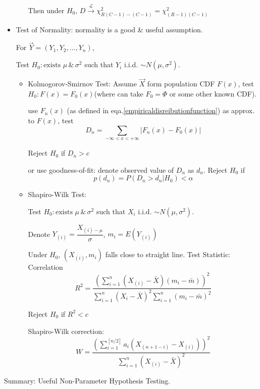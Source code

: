 \begin{itemize}
\begin{itemize}
    Then under $H_0$, $D\xrightarrow[]{\mathscr{L}}\chi^2_{R(C-1)-(C-1)}=\chi^2_{(R-1)(C-1)}$
    \end{itemize}

    \item Test of Normality: normality is a good \& useful assumption.
    
    For $\vec{Y}=(Y_1,Y_2,\ldots,Y_n)$,

    Test $H_0:\text{exists }\mu\,\&\, \sigma^2$ such that $Y_i$ i.i.d. $\sim N(\mu,\sigma^2)$.

    \begin{itemize}
        \item Kolmogorov-Smirnov Test: Assume $\vec{X}$ form population CDF $F(x)$, test $H_0:F(x)=F_0(x)$(where can take $F_0=\Phi$ or some other known CDF).
        
        use $F_n(x)$ (as defined in eqa.\ref{empiricaldisreibutionfunction}) as approx. to $F(x)$, test
        \[
            D_n=\sum_{-\infty< x<+\infty}|F_n(x)-F_0(x)|
        \]

        Reject $H_0$ if $D_n>c$

        or use goodness-of-fit: denote observed value of $D_n$ as $d_n$. Reject $H_0$ if
        \[
            p(d_n)=P(D_n>d_n|H_0)<\alpha
        \]

        \item Shapiro-Wilk Test:
        
        Test $H_0:\text{exists }\mu\,\&\, \sigma^2$ such that $X_i$ i.i.d. $\sim N(\mu,\sigma^2)$.

        Denote $Y_{(i)}=\dfrac{X_{(i)-\mu}}{\sigma}$, $m_i=E(Y_{(i)})$

        Under $H_0$, $(X_{(i)},m_i)$ falls close to straight line. Test Statistic: Correlation
        \[
            R^2=\dfrac{\left(\sum_{i=1}^n(X_{(i)}-\bar{X})(m_i-\bar{m})\right)^2}{\sum_{i=1}^n(X_{i}-\bar{X})^2\sum_{i=1}^n(m_i-\bar{m})^2}
        \]

        Reject $H_0$ if $R^2<c$

        Shapiro-Wilk correction:
        \[
            W=\dfrac{\left(\sum_{i=1}^{[n/2]}a_i(X_{(n+1-i)}-X_{(i)})\right)^2}{\sum_{i=1}^n(X_{(i)}-\bar{X})^2}
        \]
    \end{itemize}
\end{itemize}

\begin{point}
    Summary: Useful Non-Parameter Hypothesis Testing.
\end{point}
\\
\\

